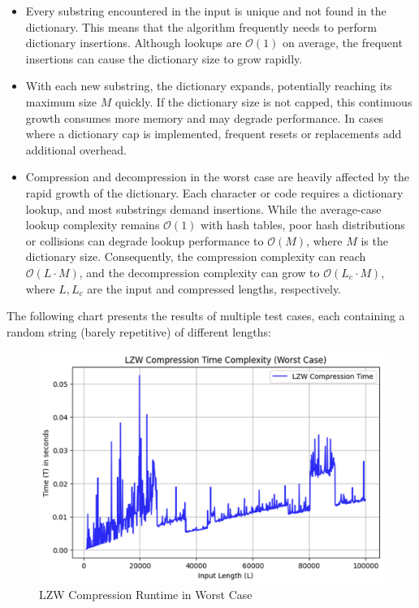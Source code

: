 \begin{itemize}
    \item Every substring encountered in the input is unique and not found in the dictionary. This means that the algorithm frequently needs to perform dictionary insertions. Although lookups are $\mathcal{O}(1)$ on average, the frequent insertions can cause the dictionary size to grow rapidly.
    \item With each new substring, the dictionary expands, potentially reaching its maximum size $M$ quickly. If the dictionary size is not capped, this continuous growth consumes more memory and may degrade performance. In cases where a dictionary cap is implemented, frequent resets or replacements add additional overhead.
    \item Compression and decompression in the worst case are heavily affected by the rapid growth of the dictionary. Each character or code requires a dictionary lookup, and most substrings demand insertions. While the average-case lookup complexity remains $\mathcal{O}(1)$ with hash tables, poor hash distributions or collisions can degrade lookup performance to $\mathcal{O}(M)$, where $M$ is the dictionary size. Consequently, the compression complexity can reach $\mathcal{O}(L \cdot M)$, and the decompression complexity can grow to $\mathcal{O}(L_c \cdot M)$, where $L, L_c$ are the input and compressed lengths, respectively.
\end{itemize}

\vspace{10pt}

The following chart presents the results of multiple test cases, each containing a random string (barely repetitive) of different lengths:

\begin{figure}[ht]
    \centering
    \includegraphics[width=0.8\linewidth]{Figures/worst_case.png}
    \caption{LZW Compression Runtime in Worst Case}
    \label{fig:worstcase}
\end{figure}


